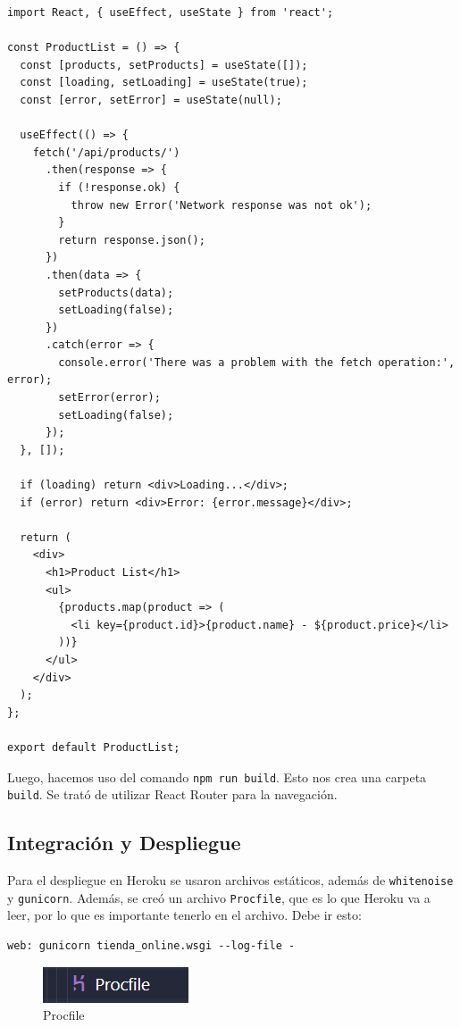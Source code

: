 \documentclass[conference]{IEEEtran}
\begin{document}
\begin{verbatim}
import React, { useEffect, useState } from 'react';

const ProductList = () => {
  const [products, setProducts] = useState([]);
  const [loading, setLoading] = useState(true);
  const [error, setError] = useState(null);

  useEffect(() => {
    fetch('/api/products/')
      .then(response => {
        if (!response.ok) {
          throw new Error('Network response was not ok');
        }
        return response.json();
      })
      .then(data => {
        setProducts(data);
        setLoading(false);
      })
      .catch(error => {
        console.error('There was a problem with the fetch operation:', error);
        setError(error);
        setLoading(false);
      });
  }, []);

  if (loading) return <div>Loading...</div>;
  if (error) return <div>Error: {error.message}</div>;

  return (
    <div>
      <h1>Product List</h1>
      <ul>
        {products.map(product => (
          <li key={product.id}>{product.name} - ${product.price}</li>
        ))}
      </ul>
    </div>
  );
};

export default ProductList;
\end{verbatim}

Luego, hacemos uso del comando \texttt{npm run build}. Esto nos crea una carpeta \texttt{build}. Se trató de utilizar React Router para la navegación.

\subsection{Integración y Despliegue}
Para el despliegue en Heroku se usaron archivos estáticos, además de \texttt{whitenoise} y \texttt{gunicorn}. Además, se creó un archivo \texttt{Procfile}, que es lo que Heroku va a leer, por lo que es importante tenerlo en el archivo. Debe ir esto:

\begin{verbatim}
web: gunicorn tienda_online.wsgi --log-file -
\end{verbatim}

\begin{figure}[htbp]
    \centering
    \includegraphics[width=\linewidth]{img/procfile.png}
    \caption{Procfile}
    \label{fig:etiqueta}
\end{figure}
\end{document}
